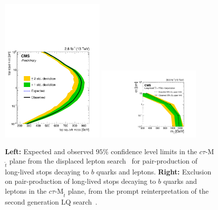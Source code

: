 \begin{figure}[t]
\begin{center}
\includegraphics[width=0.45\textwidth,angle=0]{ch5-figures/CMS-PAS-EXO-16-022_Figure_004.pdf}
\includegraphics[width=0.45\textwidth,angle=0]{ch5-figures/CMS-EXO-17-003_Figure_010.pdf}
\end{center}
\caption{{\bf Left:} Expected and observed $95\%$ confidence level limits in the $c\tau$-M$_{\tilde{t}}$ plane from the displaced lepton search~\cite{CMS-PAS-EXO-16-022} for pair-production of long-lived stops decaying to $b$ quarks and leptons. {\bf Right:}
Exclusion on pair-production of long-lived stops decaying to $b$ quarks and leptons in the $c\tau$-M$_{\tilde{t}}$ plane, from the prompt reinterpretation of the second generation LQ search~\cite{Sirunyan:2018ryt}.} %
\label{fig:exo-16}
\end{figure}




